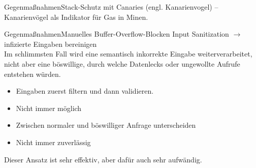 \begin{frame}{Gegenmaßnahmen}{Stack-Schutz mit Canaries} 
    (engl. Kanarienvogel) -- Kanarienvögel als
    Indikator für Gas in Minen. 
    
    
\end{frame}


\begin{frame}{Gegenmaßnahmen}{Manuelles Buffer-Overflow-Blocken}    
    Input Sanitization $\rightarrow$ infizierte Eingaben bereinigen\\ 
    Im schlimmsten Fall wird eine semantisch inkorrekte Eingabe weiterverarbeitet,\\
    nicht aber eine böswillige, durch welche Datenlecks oder ungewollte Aufrufe entstehen würden.
    \vspace{1em}
    \begin{itemize}
        \item Eingaben zuerst filtern und dann validieren.
        \item Nicht immer möglich
        \item Zwischen normaler und böswilliger Anfrage unterscheiden
        \item Nicht immer zuverlässig 
    \end{itemize} 
    \vspace{1em}
    Dieser Ansatz ist sehr effektiv, aber dafür auch sehr aufwändig.    
\end{frame}

